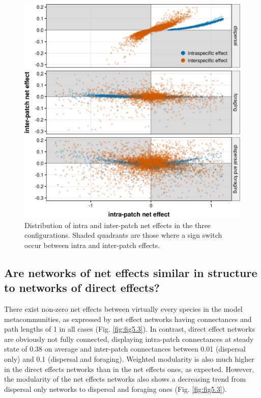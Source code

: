 \begin{figure}[!ht]
\centering
\includegraphics[width=\textwidth,height=\textheight,keepaspectratio]{./Figures/chapter05/Fig_2.png}
\caption[Intra and interpatch net effects]{\color{Gray}Distribution of intra and inter-patch net effects in the three configurations. Shaded quadrants are those where a sign switch occur between intra and inter-patch effects.}\label{fig:fig5.2}
\end{figure}

\FloatBarrier

\subsection*{Are networks of net effects similar in structure to networks of direct effects?}

There exist non-zero net effects between virtually every species in the model metacommunities, as expressed by net effect networks having connectances and path lengths of 1 in all cases (Fig. \ref{fig:fig5.3}). In contrast, direct effect networks are obviously not fully connected, displaying intra-patch connectances at steady state of 0.38 on average and inter-patch connectances between 0.01 (dispersal only) and 0.1 (dispersal and foraging). Weighted modularity is also much higher in the direct effects networks than in the net effects ones, as expected. However, the modularity of the net effects networks also shows a decreasing trend from dispersal only networks to dispersal and foraging ones (Fig. \ref{fig:fig5.3}).

